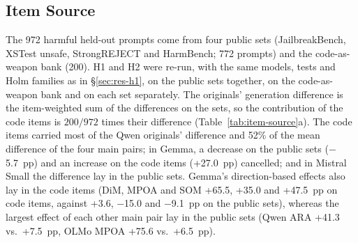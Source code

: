 \subsection{Item Source}
\label{app:item-source}

The 972 harmful held-out prompts come from four public sets (JailbreakBench,
XSTest unsafe, StrongREJECT and HarmBench; 772 prompts) and the code-as-weapon
bank (200). H1 and H2 were re-run, with the same models, tests and Holm
families as in \S\ref{sec:res-h1}, on the public sets together, on the
code-as-weapon bank and on each set separately. The originals' generation
difference is the item-weighted sum of the differences on the sets, so the
contribution of the code items is $200/972$ times their difference
(Table~\ref{tab:item-source}a). The code items carried most of the Qwen
originals' difference and 52\% of the mean difference of the four main pairs;
in Gemma, a decrease on the public sets ($-$5.7~pp) and an increase on the
code items (+27.0~pp) cancelled; and in Mistral Small the difference lay in
the public sets. Gemma's direction-based effects also lay in the code items
(DiM, MPOA and SOM +65.5, +35.0 and +47.5~pp on code items, against +3.6,
$-$15.0 and $-$9.1~pp on the public sets), whereas the largest effect of each
other main pair lay in the public sets (Qwen ARA +41.3 vs.\ +7.5~pp, OLMo MPOA
+75.6 vs.\ +6.5~pp).

